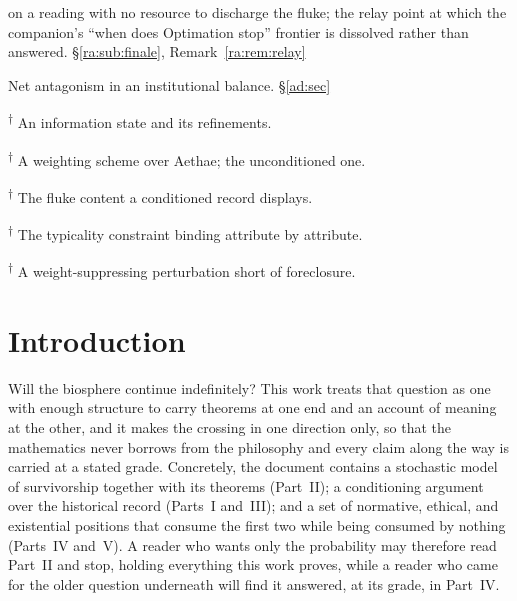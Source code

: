 \documentclass[11pt]{article}
\numberwithin{equation}{section}
\theoremstyle{plain}
\theoremstyle{definition}
\theoremstyle{remark}
\begin{document}
\begin{description}
on a reading with no resource to discharge the fluke; the relay point at
which the companion's ``when does Optimation stop'' frontier is
dissolved rather than answered. \S\ref{ra:sub:finale},
Remark~\ref{ra:rem:relay}
\item[Adversivity] Net antagonism in an institutional balance.
\S\ref{ad:sec}
\item[Aethus / Aethae]\textsuperscript{$\dagger$} An information state
and its refinements.
\item[Nexus / Cosmic Nexus]\textsuperscript{$\dagger$} A weighting scheme
over Aethae; the unconditioned one.
\item[Optimation]\textsuperscript{$\dagger$} The fluke content a
conditioned record displays.
\item[Accordance Principle]\textsuperscript{$\dagger$} The typicality
constraint binding attribute by attribute.
\item[Imperfection Magnitude Drop]\textsuperscript{$\dagger$} A
weight-suppressing perturbation short of foreclosure.
\end{description}

\section{Introduction}\label{intro:sec}

Will the biosphere continue indefinitely? This work treats that
question as one with enough structure to carry theorems at one end
and an account of meaning at the other, and it makes the crossing in
one direction only, so that the mathematics never borrows from the
philosophy and every claim along the way is carried at a stated
grade. Concretely, the document contains a stochastic model of
survivorship together with its theorems (Part~II); a conditioning
argument over the historical record (Parts~I and~III); and a set of
normative, ethical, and existential positions that consume the first
two while being consumed by nothing (Parts~IV and~V). A reader who
wants only the probability may therefore read Part~II and stop,
holding everything this work proves, while a reader who came for the
older question underneath will find it answered, at its grade, in
Part~IV.
\end{document}
